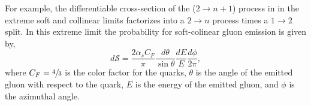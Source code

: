 For example, the differentiable cross-section of the ($2\rightarrow n+1$) process in  in the extreme soft and collinear limits factorizes into a $2 \rightarrow n$ process times a $1 \rightarrow 2$ split.
In this extreme limit the probability for soft-colinear gluon emission is given by,
\begin{equation}
	\label{eq:gluon_emission}
	d \mathcal{S} = \frac{2 \alpha_s C_F}{\pi} \frac{d \theta}{\sin\theta} \frac{dE}{E} \frac{d\phi}{2\pi},
\end{equation}
where $C_F = \sfrac{4}{3}$ is the color factor for the quarks, $\theta$ is the angle of the emitted gluon with respect to the quark, $E$ is the energy of the emitted gluon, and $\phi$ is the azimuthal angle.
